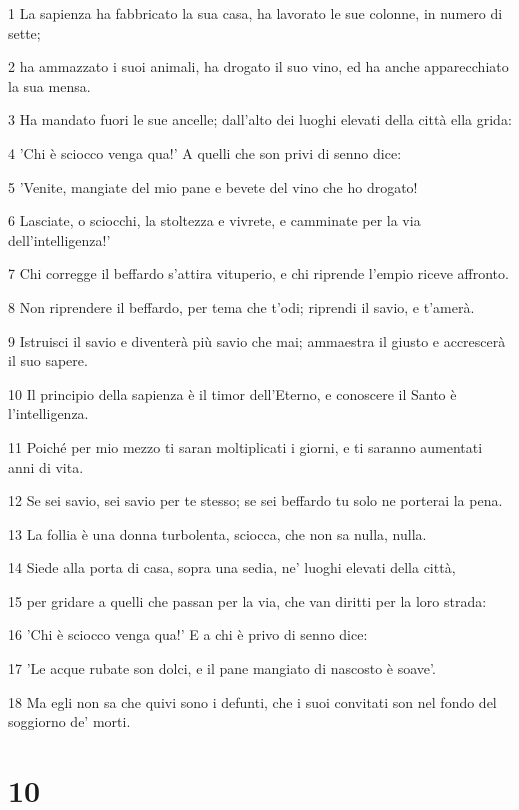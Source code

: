 \par 1 La sapienza ha fabbricato la sua casa, ha lavorato le sue colonne, in numero di sette;
\par 2 ha ammazzato i suoi animali, ha drogato il suo vino, ed ha anche apparecchiato la sua mensa.
\par 3 Ha mandato fuori le sue ancelle; dall'alto dei luoghi elevati della città ella grida:
\par 4 'Chi è sciocco venga qua!' A quelli che son privi di senno dice:
\par 5 'Venite, mangiate del mio pane e bevete del vino che ho drogato!
\par 6 Lasciate, o sciocchi, la stoltezza e vivrete, e camminate per la via dell'intelligenza!'
\par 7 Chi corregge il beffardo s'attira vituperio, e chi riprende l'empio riceve affronto.
\par 8 Non riprendere il beffardo, per tema che t'odi; riprendi il savio, e t'amerà.
\par 9 Istruisci il savio e diventerà più savio che mai; ammaestra il giusto e accrescerà il suo sapere.
\par 10 Il principio della sapienza è il timor dell'Eterno, e conoscere il Santo è l'intelligenza.
\par 11 Poiché per mio mezzo ti saran moltiplicati i giorni, e ti saranno aumentati anni di vita.
\par 12 Se sei savio, sei savio per te stesso; se sei beffardo tu solo ne porterai la pena.
\par 13 La follia è una donna turbolenta, sciocca, che non sa nulla, nulla.
\par 14 Siede alla porta di casa, sopra una sedia, ne' luoghi elevati della città,
\par 15 per gridare a quelli che passan per la via, che van diritti per la loro strada:
\par 16 'Chi è sciocco venga qua!' E a chi è privo di senno dice:
\par 17 'Le acque rubate son dolci, e il pane mangiato di nascosto è soave'.
\par 18 Ma egli non sa che quivi sono i defunti, che i suoi convitati son nel fondo del soggiorno de' morti.

\chapter{10}

